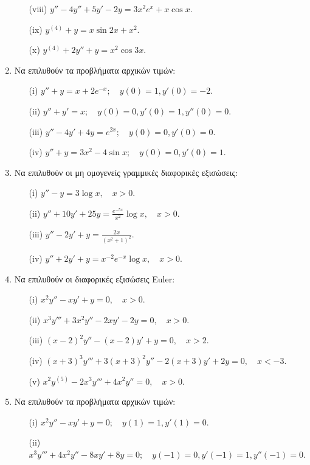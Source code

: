 \documentclass[11pt,a4paper,twoside]{book}
\begin{document}
\begin{enumerate}
\begin{enumerate}
        \item[(viii)] $y''-4y''+5y'-2y=3x^2e^x+x\cos x$.
        \item[(ix)] $y^{(4)}+y=x\sin 2x+x^2$.
        \item[(x)] $y^{(4)}+2y''+y=x^2\cos 3x$.
    \end{enumerate}
    \item Να επιλυθούν τα προβλήματα αρχικών τιμών:
    \begin{enumerate}
        \item[(i)] $y''+y=x+2e^{-x}; \quad y(0)=1, y'(0)=-2$.
        \item[(ii)] $y''+y'=x; \quad y(0)=0, y'(0)=1, y''(0)=0$.
        \item[(iii)] $y''-4y'+4y=e^{2x}; \quad y(0)=0, y'(0)=0$.
        \item[(iv)] $y''+y=3x^2-4\sin x; \quad y(0)=0, y'(0)=1$.
    \end{enumerate}
    \item Να επιλυθούν οι μη ομογενείς γραμμικές διαφορικές εξισώσεις:
    \begin{enumerate}
        \item[(i)] $y''-y=3\log x, \quad x>0$.
        \item[(ii)] $y''+10y'+25y=\frac{e^{-5x}}{x^2}\log x, \quad x>0$.
    \item[(iii)] $y''-2y'+y=\frac{2x}{(x^2+1)^2}$.
    \item[(iv)] $y''+2y'+y=x^{-2}e^{-x}\log x, \quad x>0$.
\end{enumerate}
\item Να επιλυθούν οι διαφορικές εξισώσεις Euler:
\begin{enumerate}
    \item[(i)] $x^2y''-xy'+y=0, \quad x>0$.
    \item[(ii)] $x^3y'''+3x^2y''-2xy'-2y=0, \quad x>0$.
    \item[(iii)] $(x-2)^2y''-(x-2)y'+y=0, \quad x>2$.
    \item[(iv)] $(x+3)^3y'''+3(x+3)^2y''-2(x+3)y'+2y=0, \quad x<-3$.
    \item[(v)] $x^2y^{(5)}-2x^3y'''+4x^2y''=0, \quad x>0$.
\end{enumerate}
\item Να επιλυθούν τα προβλήματα αρχικών τιμών:
\begin{enumerate}
    \item[(i)] $x^2y''-xy'+y=0; \quad y(1)=1, y'(1)=0$.
    \item[(ii)] $x^3y'''+4x^2y''-8xy'+8y=0; \quad y(-1)=0, y'(-1)=1, y''(-1)=0$.

\end{enumerate}
\end{enumerate}
\end{document}
